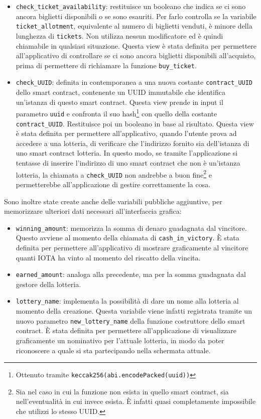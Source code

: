 \documentclass[12pt,a4paper,openright,twoside]{report}
\begin{document}
\begin{itemize}\label{uuid}
    \item \texttt{check\_ticket\_availability}: restituisce un booleano che indica se ci sono ancora biglietti disponibili o se sono esauriti. Per farlo controlla se la variabile \texttt{ticket\_allotment}, equivalente al numero di biglietti venduti, è minore della lunghezza di \texttt{tickets}. Non utilizza nessun modificatore ed è quindi chiamabile in qualsiasi situazione. Questa view è stata definita per permettere all'applicativo di controllare se ci sono ancora biglietti disponibili all'acquisto, prima di permettere di richiamare la funzione \texttt{buy\_ticket}.
    \item \texttt{check\_UUID}: definita in contemporanea a una nuova costante \texttt{contract\_UUID} dello smart contract, contenente un UUID immutabile che identifica un'istanza di questo smart contract. Questa view prende in input il parametro \texttt{uuid} e confronta il suo hash\footnote{Ottenuto tramite \texttt{keccak256(abi.encodePacked(uuid))}} con quello della costante \texttt{contract\_UUID}. Restituisce poi un booleano in base al risultato. Questa view è stata definita per permettere all'applicativo, quando l'utente prova ad accedere a una lotteria, di verificare che l'indirizzo fornito sia dell'istanza di uno smart contract lotteria. In questo modo, se tramite l'applicazione si tentasse di inserire l'indirizzo di uno smart contract che non è un'istanza lotteria, la chiamata a \texttt{check\_UUID} non andrebbe a buon fine\footnote{Sia nel caso in cui la funzione non esista in quello smart contract, sia nell'eventualità in cui invece esista. È infatti quasi completamente impossibile che utilizzi lo stesso UUID.} e permetterebbe all'applicazione di gestire correttamente la cosa.
\end{itemize}
Sono inoltre state create anche delle variabili pubbliche aggiuntive, per memorizzare ulteriori dati necessari all'interfaccia grafica:
\begin{itemize}
    \item \texttt{winning\_amount}: memorizza la somma di denaro guadagnata dal vincitore. Questo avviene al momento della chiamata di \texttt{cash\_in\_victory}. È stata definita per permettere all'applicativo di mostrare graficamente al vincitore quanti IOTA ha vinto al momento del riscatto della vincita.
    \item \texttt{earned\_amount}: analoga alla precedente, ma per la somma guadagnata dal gestore della lotteria.
    \item \texttt{lottery\_name}: implementa la possibilità di dare un nome alla lotteria al momento della creazione. Questa variabile viene infatti registrata tramite un nuovo parametro \texttt{new\_lottery\_name} della funzione costruttore dello smart contract. È stata definita per permettere all'applicazione di visualizzare graficamente un nominativo per l'attuale lotteria, in modo da poter riconoscere a quale si sta partecipando nella schermata attuale.
\end{itemize}
\end{document}
